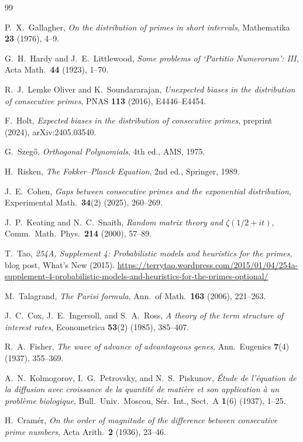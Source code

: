 \documentclass[11pt, a4paper]{amsart}
\theoremstyle{plain}
\theoremstyle{definition}
\begin{document}
\begin{thebibliography}{99}

P.~X.~Gallagher, \emph{On the distribution of primes in short intervals}, Mathematika \textbf{23} (1976), 4--9.

G.~H.~Hardy and J.~E.~Littlewood, \emph{Some problems of `Partitio Numerorum': III}, Acta Math.\ \textbf{44} (1923), 1--70.

R.~J.~Lemke Oliver and K.~Soundararajan, \emph{Unexpected biases in the distribution of consecutive primes}, PNAS \textbf{113} (2016), E4446--E4454.

F.~Holt, \emph{Expected biases in the distribution of consecutive primes}, preprint (2024), arXiv:2405.03540.

G.~Szeg\H{o}, \emph{Orthogonal Polynomials}, 4th ed., AMS, 1975.

H.~Risken, \emph{The Fokker--Planck Equation}, 2nd ed., Springer, 1989.

J.~E.~Cohen, \emph{Gaps between consecutive primes and the exponential distribution}, Experimental Math.\ \textbf{34}(2) (2025), 260--269.

J.~P.~Keating and N.~C.~Snaith, \emph{Random matrix theory and $\zeta(1/2+it)$}, Comm.\ Math.\ Phys.\ \textbf{214} (2000), 57--89.

T.~Tao, \emph{254A, Supplement 4: Probabilistic models and heuristics for the primes}, blog post, What's New (2015). \url{https://terrytao.wordpress.com/2015/01/04/254a-supplement-4-probabilistic-models-and-heuristics-for-the-primes-optional/}

M.~Talagrand, \emph{The Parisi formula}, Ann.\ of Math.\ \textbf{163} (2006), 221--263.

J.~C.~Cox, J.~E.~Ingersoll, and S.~A.~Ross, \emph{A theory of the term structure of interest rates}, Econometrica \textbf{53}(2) (1985), 385--407.

R.~A.~Fisher, \emph{The wave of advance of advantageous genes}, Ann.\ Eugenics \textbf{7}(4) (1937), 355--369.

A.~N.~Kolmogorov, I.~G.~Petrovsky, and N.~S.~Piskunov, \emph{\'Etude de l'\'equation de la diffusion avec croissance de la quantit\'e de mati\`ere et son application \`a un probl\`eme biologique}, Bull.\ Univ.\ Moscou, S\'er.\ Int., Sect.~A \textbf{1}(6) (1937), 1--25.

H.~Cram\'er, \emph{On the order of magnitude of the difference between consecutive prime numbers}, Acta Arith.\ \textbf{2} (1936), 23--46.

\end{thebibliography}
\end{document}
